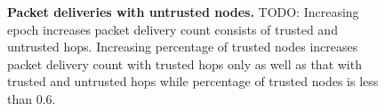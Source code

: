 \documentclass[11pt]{article}
\begin{document}
\begin{figure}[t!]
\center
{}
\hfill
{}
\caption{{\bf Packet deliveries with untrusted nodes.}
TODO: Increasing epoch increases packet delivery count consists of trusted and untrusted hops.  Increasing percentage of trusted nodes increases packet delivery count with trusted hops only as well as that with trusted and untrusted hops while percentage of trusted nodes is less than $0.6$.
}
\label{fig:delivery_count}
\end{figure}
\end{document}
